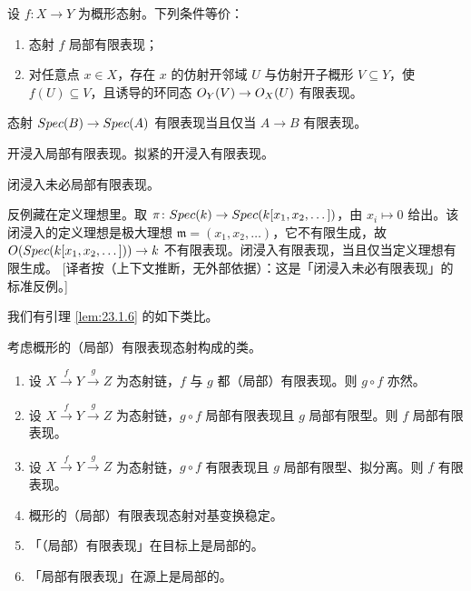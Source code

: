 \begin{lemma}\label{lem:23.2.2}
设 $f\colon X \to Y$ 为概形态射。下列条件等价：
\begin{enumerate}[label=(\roman*),leftmargin=2em,itemsep=0.25ex]
  \item 态射 $f$ 局部有限表现；
  \item 对任意点 $x \in X$，存在 $x$ 的仿射开邻域 $U$ 与仿射开子概形 $V \subseteq Y$，使 $f(U) \subseteq V$，且诱导的环同态 $O_Y(V) \to O_X(U)$ 有限表现。
\end{enumerate}
\end{lemma}

\begin{corollary}\label{cor:23.2.3}
态射 $Spec(B) \to Spec(A)$ 有限表现当且仅当 $A \to B$ 有限表现。
\end{corollary}

\begin{corollary}\label{cor:23.2.4}
开浸入局部有限表现。拟紧的开浸入有限表现。
\end{corollary}

\begin{warning}\label{warn:23.2.5}
闭浸入未必局部有限表现。
\end{warning}

\begin{yizhu}
反例藏在定义理想里。取 $\pi\colon Spec(k) \to Spec(k[x_1,x_2,\dots])$，由 $x_i \mapsto 0$ 给出。该闭浸入的定义理想是极大理想 $\mathfrak m = (x_1,x_2,\dots)$，它不有限生成，故 $O(Spec(k[x_1,x_2,\dots])) \to k$ 不有限表现。闭浸入有限表现，当且仅当定义理想有限生成。
[译者按（上下文推断，无外部依据）：这是「闭浸入未必有限表现」的标准反例。]
\end{yizhu}

我们有引理 \ref{lem:23.1.6} 的如下类比。

\begin{lemma}\label{lem:23.2.6}
考虑概形的（局部）有限表现态射构成的类。
\begin{enumerate}[label=(\roman*),leftmargin=2em,itemsep=0.25ex]
  \item 设 $X \xrightarrow{f} Y \xrightarrow{g} Z$ 为态射链，$f$ 与 $g$ 都（局部）有限表现。则 $g \circ f$ 亦然。
  \item 设 $X \xrightarrow{f} Y \xrightarrow{g} Z$ 为态射链，$g \circ f$ 局部有限表现且 $g$ 局部有限型。则 $f$ 局部有限表现。
  \item[(ii')] 设 $X \xrightarrow{f} Y \xrightarrow{g} Z$ 为态射链，$g \circ f$ 有限表现且 $g$ 局部有限型、拟分离。则 $f$ 有限表现。
  \item 概形的（局部）有限表现态射对基变换稳定。
  \item 「（局部）有限表现」在目标上是局部的。
  \item 「局部有限表现」在源上是局部的。
\end{enumerate}
\end{lemma}

